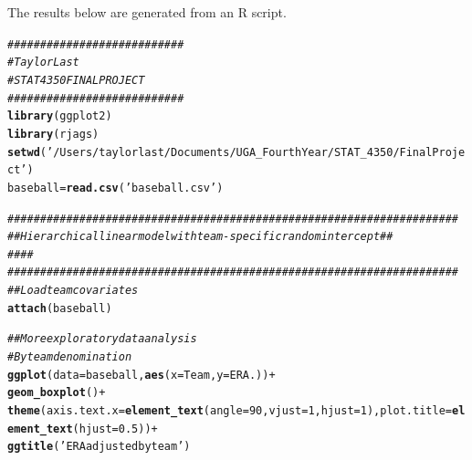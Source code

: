 \documentclass{article}\usepackage[]{graphicx}\usepackage[]{color}
\makeatletter
\newcommand{\hlnum}[1]{\textcolor[rgb]{0.686,0.059,0.569}{#1}}%
\newcommand{\hlstr}[1]{\textcolor[rgb]{0.192,0.494,0.8}{#1}}%
\newcommand{\hlcom}[1]{\textcolor[rgb]{0.678,0.584,0.686}{\textit{#1}}}%
\newcommand{\hlopt}[1]{\textcolor[rgb]{0,0,0}{#1}}%
\newcommand{\hlstd}[1]{\textcolor[rgb]{0.345,0.345,0.345}{#1}}%
\newcommand{\hlkwb}[1]{\textcolor[rgb]{0.69,0.353,0.396}{#1}}%
\newcommand{\hlkwc}[1]{\textcolor[rgb]{0.333,0.667,0.333}{#1}}%
\newcommand{\hlkwd}[1]{\textcolor[rgb]{0.737,0.353,0.396}{\textbf{#1}}}%
\newenvironment{kframe}{%
 \def\at@end@of@kframe{}%
 \ifinner\ifhmode%
  \def\at@end@of@kframe{\end{minipage}}%
  \begin{minipage}{\columnwidth}%
 \fi\fi%
 \def\FrameCommand##1{\hskip\@totalleftmargin \hskip-\fboxsep
 \colorbox{shadecolor}{##1}\hskip-\fboxsep
     \hskip-\linewidth \hskip-\@totalleftmargin \hskip\columnwidth}%
 \MakeFramed {\advance\hsize-\width
   \@totalleftmargin\z@ \linewidth\hsize
   \@setminipage}}%
 {\par\unskip\endMakeFramed%
 \at@end@of@kframe}
\newenvironment{knitrout}{}{} %
\makeatother
\begin{document}
\title{}



\maketitle
The results below are generated from an R script.

\begin{knitrout}
\color{fgcolor}\begin{kframe}
\begin{alltt}
\hlcom{###########################}
\hlcom{# Taylor Last}
\hlcom{# STAT 4350 FINAL PROJECT}
\hlcom{###########################}
\hlkwd{library}\hlstd{(ggplot2)}
\hlkwd{library}\hlstd{(rjags)}
\hlkwd{setwd}\hlstd{(}\hlstr{'/Users/taylorlast/Documents/UGA_FourthYear/STAT_4350/Final Project'}\hlstd{)}
\hlstd{baseball} \hlkwb{=} \hlkwd{read.csv}\hlstd{(}\hlstr{'baseball.csv'}\hlstd{)}

\hlcom{#####################################################################}
\hlcom{## Hierarchical linear model with team-specific random intercept   ##}
\hlcom{##                                                                 ##}
\hlcom{#####################################################################}
\hlcom{## Load team covariates}
\hlkwd{attach}\hlstd{(baseball)}
\end{alltt}


{\ttfamily\noindent\itshape\color{messagecolor}{\#\# The following objects are masked from baseball (pos = 3):\\\#\# \\\#\#\ \ \ \  BABIP, ERA., HR.9, K.BB., LOB., Name, Team, WAR, WHIP, WIN., X}}

{\ttfamily\noindent\itshape\color{messagecolor}{\#\# The following objects are masked from baseball (pos = 7):\\\#\# \\\#\#\ \ \ \  BABIP, ERA., HR.9, K.BB., LOB., Name, Team, WAR, WHIP, WIN., X}}

{\ttfamily\noindent\itshape\color{messagecolor}{\#\# The following objects are masked from baseball (pos = 10):\\\#\# \\\#\#\ \ \ \  BABIP, ERA., HR.9, K.BB., LOB., Name, Team, WAR, WHIP, WIN., X}}\begin{alltt}
\hlcom{## More exploratory data analysis}
\hlcom{# By team denomination}
\hlkwd{ggplot}\hlstd{(}\hlkwc{data}\hlstd{=baseball,}\hlkwd{aes}\hlstd{(}\hlkwc{x}\hlstd{=Team,}\hlkwc{y}\hlstd{=ERA.))}\hlopt{+}
  \hlkwd{geom_boxplot}\hlstd{()}\hlopt{+}
  \hlkwd{theme}\hlstd{(}\hlkwc{axis.text.x} \hlstd{=} \hlkwd{element_text}\hlstd{(}\hlkwc{angle} \hlstd{=} \hlnum{90}\hlstd{,} \hlkwc{vjust} \hlstd{=} \hlnum{1}\hlstd{,} \hlkwc{hjust} \hlstd{=} \hlnum{1}\hlstd{),}\hlkwc{plot.title} \hlstd{=} \hlkwd{element_text}\hlstd{(}\hlkwc{hjust} \hlstd{=} \hlnum{0.5}\hlstd{))}\hlopt{+}
  \hlkwd{ggtitle}\hlstd{(}\hlstr{'ERA adjusted by team'}\hlstd{)}
\end{alltt}
\end{kframe}


\end{knitrout}
\end{document}
